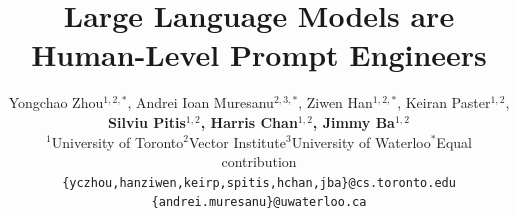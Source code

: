 \documentclass{article} %
\title{Large Language Models are Human-Level Prompt Engineers}
\author{Yongchao Zhou$^{1,2,*}$, Andrei Ioan Muresanu$^{2,3,*}$, Ziwen Han$^{1,2,*}$, Keiran Paster$^{1,2}$, \\\textbf{Silviu Pitis$^{1,2}$, Harris Chan$^{1,2}$, Jimmy Ba$^{1,2}$} \\
$^1$University of Toronto\quad $^2$Vector Institute\quad $^3$University of Waterloo\quad $^*$Equal contribution\\
\texttt{\{yczhou,hanziwen,keirp,spitis,hchan,jba\}@cs.toronto.edu}\\
\texttt{\{andrei.muresanu\}@uwaterloo.ca}
}
\begin{document}
\maketitle
\renewcommand*{\thefootnote}{\arabic{footnote}}
\setcounter{footnote}{0}
\end{document}
